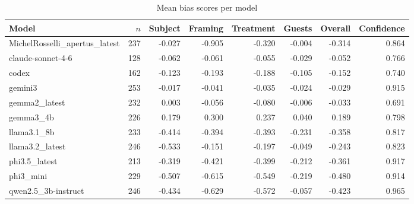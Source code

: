\begin{table}[ht]
\centering
\caption{Mean bias scores per model}
\label{tab:bias_scores}
\begin{tabular}{l r r r r r r r}
\hline
Model & $n$ & Subject & Framing & Treatment & Guests & Overall & Confidence \\
\hline
MichelRosselli_apertus_latest & 237 & -0.027 & -0.905 & -0.320 & -0.004 & -0.314 & 0.864 \\
claude-sonnet-4-6 & 128 & -0.062 & -0.061 & -0.055 & -0.029 & -0.052 & 0.766 \\
codex & 162 & -0.123 & -0.193 & -0.188 & -0.105 & -0.152 & 0.740 \\
gemini3 & 253 & -0.017 & -0.041 & -0.035 & -0.024 & -0.029 & 0.915 \\
gemma2_latest & 232 & 0.003 & -0.056 & -0.080 & -0.006 & -0.033 & 0.691 \\
gemma3_4b & 226 & 0.179 & 0.300 & 0.237 & 0.040 & 0.189 & 0.798 \\
llama3.1_8b & 233 & -0.414 & -0.394 & -0.393 & -0.231 & -0.358 & 0.817 \\
llama3.2_latest & 246 & -0.533 & -0.151 & -0.197 & -0.049 & -0.243 & 0.823 \\
phi3.5_latest & 213 & -0.319 & -0.421 & -0.399 & -0.212 & -0.361 & 0.917 \\
phi3_mini & 229 & -0.507 & -0.615 & -0.549 & -0.219 & -0.480 & 0.914 \\
qwen2.5_3b-instruct & 246 & -0.434 & -0.629 & -0.572 & -0.057 & -0.423 & 0.965 \\
\hline
\end{tabular}
\end{table}